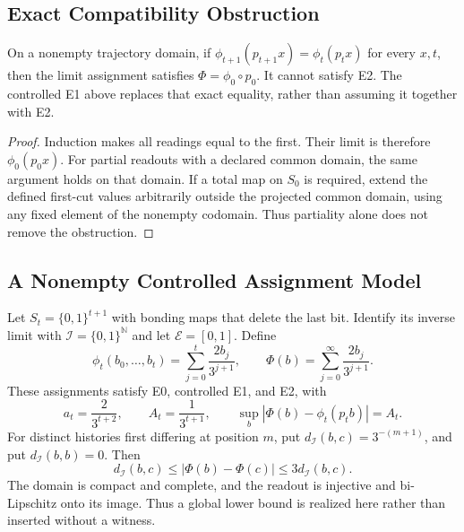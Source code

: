 \subsection{Exact Compatibility Obstruction}

\begin{proposition}\label{prop:exact-e1-obstruction}
On a nonempty trajectory domain, if $\phi_{t+1}(p_{t+1}x)=\phi_t(p_tx)$ for every $x,t$, then the limit assignment satisfies $\Phi=\phi_0\circ p_0$. It cannot satisfy E2. The controlled E1 above replaces that exact equality, rather than assuming it together with E2.
\end{proposition}

\begin{proof}
Induction makes all readings equal to the first. Their limit is therefore $\phi_0(p_0x)$. For partial readouts with a declared common domain, the same argument holds on that domain. If a total map on $S_0$ is required, extend the defined first-cut values arbitrarily outside the projected common domain, using any fixed element of the nonempty codomain. Thus partiality alone does not remove the obstruction.
\end{proof}

\subsection{A Nonempty Controlled Assignment Model}

\begin{theorem}\label{thm:ternary-regime-realization}
Let $S_t=\{0,1\}^{t+1}$ with bonding maps that delete the last bit. Identify its inverse limit with $\mathcal I=\{0,1\}^{\mathbb N}$ and let $\mathcal E=[0,1]$. Define
\[
\phi_t(b_0,\ldots,b_t)=\sum_{j=0}^t\frac{2b_j}{3^{j+1}},
\qquad
\Phi(b)=\sum_{j=0}^{\infty}\frac{2b_j}{3^{j+1}}.
\]
These assignments satisfy E0, controlled E1, and E2, with
\[
a_t=\frac{2}{3^{t+2}},\qquad
A_t=\frac{1}{3^{t+1}},\qquad
\sup_b|\Phi(b)-\phi_t(p_tb)|=A_t.
\]
For distinct histories first differing at position $m$, put $d_{\mathcal I}(b,c)=3^{-(m+1)}$, and put $d_{\mathcal I}(b,b)=0$. Then
\[
d_{\mathcal I}(b,c)\leq|\Phi(b)-\Phi(c)|\leq3d_{\mathcal I}(b,c).
\]
The domain is compact and complete, and the readout is injective and bi-Lipschitz onto its image. Thus a global lower bound is realized here rather than inserted without a witness.
\end{theorem}

